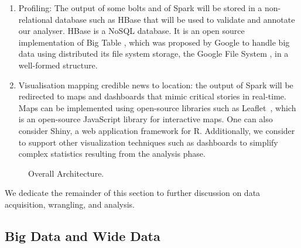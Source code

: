 \begin{enumerate}
\item Profiling: The output of some bolts and of Spark will be stored in a non-relational database such as HBase that will be used to validate and annotate our analyser. HBase is a NoSQL database. It is an open source implementation of Big Table \cite{ChangDGHWBCFG08}, which was proposed by Google to handle big data using distributed its file system storage, the Google
File System \cite{GhemawatGL03}, in a well-formed structure. 

\item Visualisation mapping credible news to location: the output of Spark will be redirected to maps and dashboards that mimic critical stories in real-time. Maps can be implemented using open-source libraries such as Leaflet~\cite{leafleft}, which is an open-source JavaScript library for interactive maps. One can also consider Shiny, a web application framework for R. Additionally, we consider to support other visualization techniques such as dashboards to simplify complex statistics resulting from the analysis phase. 

\end{enumerate}

\begin{figure}
\centering
\caption{Overall Architecture.}
\label{fig:architecture}
\end{figure}

We dedicate the remainder of this section to further discussion on data acquisition, wrangling, and analysis. 


\subsection{Big Data and Wide Data} 


